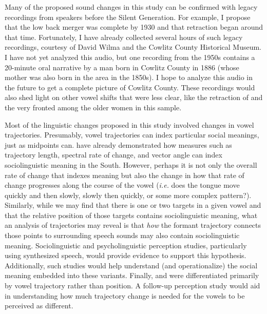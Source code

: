 Many of the proposed sound changes in this study can be confirmed with legacy recordings from speakers before the Silent Generation. For example, I propose that the low back merger was complete by 1930 and that \trap retraction began around that time. Fortunately, I have already collected several hours of such legacy recordings, courtesy of David Wilma and the Cowlitz County Historical Museum. I have not yet analyzed this audio, but one recording from the 1950s contains a 20-minute oral narrative by a man born in Cowlitz County in 1886 (whose mother was also born in the area in the 1850s). I hope to analyze this audio in the future to get a complete picture of Cowlitz County. These recordings would also shed light on other vowel shifts that were less clear, like the retraction of \bin and the very fronted \ben among the older women in this sample.

Most of the linguistic changes proposed in this study involved changes in vowel trajectories. Presumably, vowel trajectories can index particular social meanings, just as midpoints can. \citet{farrington_etal_2018} have already demonstrated how measures such as trajectory length, spectral rate of change, and vector angle can index sociolinguistic meaning in the South. However, perhaps it is not only the overall rate of change that indexes meaning but also the change in how that rate of change progresses along the course of the vowel (\textit{i.e.} does the tongue move quickly and then slowly, slowly then quickly, or some more complex pattern?). Similarly, while we may find that there is one or two targets in a given vowel and that the relative position of those targets contains sociolinguistic meaning, what an analysis of trajectories may reveal is that \textit{how} the formant trajectory connects those points to surrounding speech sounds may also contain sociolinguistic meaning. Sociolinguistic and psycholinguistic perception studies, particularly using synthesized speech, would provide evidence to support this hypothesis. Additionally, such studies would help understand (and operationalize) the social meaning embedded into these variants. Finally, \lot and \thought were differentiated primarily by vowel trajectory rather than position. A follow-up perception study would aid in understanding how much trajectory change is needed for the vowels to be perceived as different.

